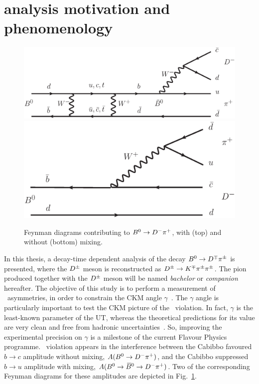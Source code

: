 
\section[$\Bz\to\Dmp\pipm$ analysis motivation and phenomenology]{\boldmath{$\Bz\to\Dmp\pipm$} analysis motivation and phenomenology}
\label{sec:intro}
\setlength{\textfloatsep}{30pt}
\begin{figure}[t]
        \begin{center}
                \includegraphics[width=0.8\linewidth]{01Introduction/figs/Mixed.eps}
                \includegraphics[width=0.7\linewidth]{01Introduction/figs/Unmixed.eps}
        \end{center}
        \vspace{-2mm}
        \caption{Feynman diagrams contributing to $B^0\rightarrow D^-\pi^+$, with (top) and without (bottom) mixing.}
        \label{fig:Feynman}
        \afterpage{\global\setlength{\textfloatsep}{\oldtextfloatsep}}
\end{figure}
In this thesis, a decay-time dependent analysis of the decay $\Bz\to
\Dmp\pipm$ is presented, where the $D^\pm$ meson is reconstructed as $D^\pm\rightarrow K^\mp\pi^\pm\pi^\pm$. The 
pion produced together with the $D^\pm$ meson will be named \emph{bachelor} or \emph{companion} hereafter.
The objective of this study is to perform a
measurement of \CP~asymmetries, in order to constrain the CKM angle
$\gamma$~\cite{PRL-10-1963-531,PTP-49-1973-652}. The $\gamma$ angle is particularly important to test 
the CKM picture of the \CP~violation. In fact, $\gamma$ is the least-known parameter of the UT, whereas 
the theoretical predictions for its value are very clean and free from hadronic uncertainties~\cite{Fleischer:2003yb,Aleksan:1991nh,Dunietz:1987bvsss}. 
So, improving the experimental precision on $\gamma$ is a milestone of the current Flavour Physics programme.
\CP~violation appears in the interference between the Cabibbo favoured $b\to c$
amplitude without mixing, $A(B^0\rightarrow D^-\pi^+)$, and the Cabibbo suppressed $b\to u$
amplitude with mixing, $A(B^0\rightarrow\kern 0.18em\overline{\kern -0.18em B}{}^0\rightarrow D^-\pi^+)$. Two of the corresponding
Feynman diagrams for these amplitudes are depicted in Fig.~\ref{fig:Feynman}.

